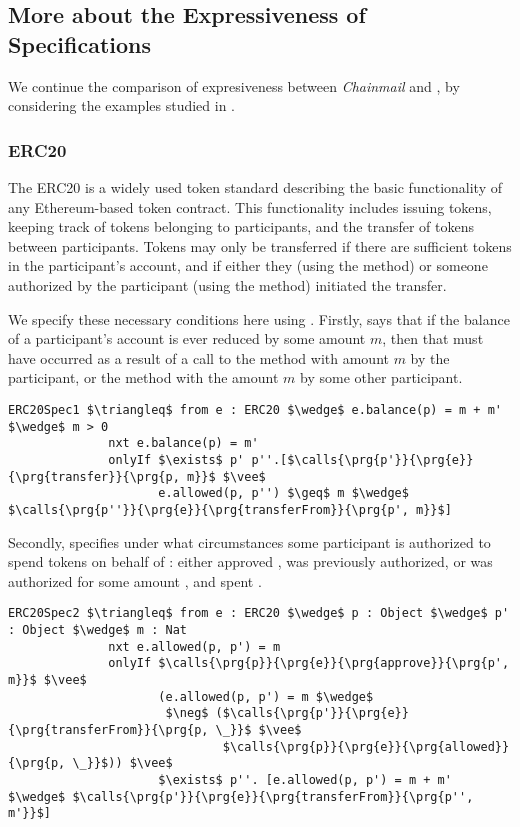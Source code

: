 \subsection{More about the Expressiveness of \Nec Specifications}
\label{s:expressiveness:appendix}

 We continue the comparison of expresiveness between \emph{Chainmail} and \Nec, by 
 considering the examples studied in \cite{FASE}.
 
\subsubsection{ERC20}
The ERC20\cite{ERC20} is a widely used token standard describing the basic functionality of any Ethereum-based token 
contract. This functionality includes issuing tokens, keeping track of tokens belonging to participants, and the 
transfer of tokens between participants. Tokens may only be transferred if there are sufficient tokens in the 
participant's account, and if either they (using the  method) or someone authorized by the participant (using the  method) initiated the transfer. 

We specify these necessary conditions here using \Nec. Firstly,  
says that if the balance of a participant's account is ever reduced by some amount $m$, then
that must have occurred as a result of a call to the  method with amount $m$ by the participant,
or the  method with the amount $m$ by some other participant.
\begin{lstlisting}[language = Chainmail, mathescape=true, frame=lines]
ERC20Spec1 $\triangleq$ from e : ERC20 $\wedge$ e.balance(p) = m + m' $\wedge$ m > 0
              nxt e.balance(p) = m'
              onlyIf $\exists$ p' p''.[$\calls{\prg{p'}}{\prg{e}}{\prg{transfer}}{\prg{p, m}}$ $\vee$ 
                     e.allowed(p, p'') $\geq$ m $\wedge$ $\calls{\prg{p''}}{\prg{e}}{\prg{transferFrom}}{\prg{p', m}}$]
\end{lstlisting}
Secondly,  specifies under what circumstances some participant  is authorized to 
spend  tokens on behalf of : either  approved ,  was previously authorized,
or  was authorized for some amount , and spent .
\begin{lstlisting}[language = Chainmail, mathescape=true, frame=lines]
ERC20Spec2 $\triangleq$ from e : ERC20 $\wedge$ p : Object $\wedge$ p' : Object $\wedge$ m : Nat
              nxt e.allowed(p, p') = m
              onlyIf $\calls{\prg{p}}{\prg{e}}{\prg{approve}}{\prg{p', m}}$ $\vee$ 
                     (e.allowed(p, p') = m $\wedge$ 
                      $\neg$ ($\calls{\prg{p'}}{\prg{e}}{\prg{transferFrom}}{\prg{p, \_}}$ $\vee$ 
                              $\calls{\prg{p}}{\prg{e}}{\prg{allowed}}{\prg{p, \_}}$)) $\vee$
                     $\exists$ p''. [e.allowed(p, p') = m + m' $\wedge$ $\calls{\prg{p'}}{\prg{e}}{\prg{transferFrom}}{\prg{p'', m'}}$]
\end{lstlisting}

